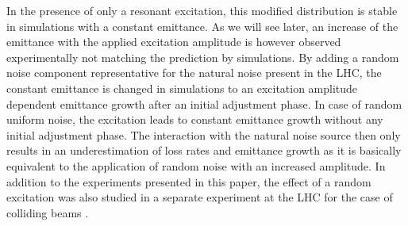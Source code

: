 \documentclass[%
 reprint,
 amsmath,amssymb,
 aps,
prstab,
longbibliography
]{revtex4-1}
\begin{document}
In the presence of only a resonant excitation, this modified
distribution is stable in simulations with a constant emittance. As we
will see later, an increase of the emittance with the applied
excitation amplitude is however observed experimentally not matching
the prediction by simulations. By adding a random noise component
representative for the natural noise present in the LHC, the constant
emittance is changed in simulations to an excitation amplitude
dependent emittance growth after an initial adjustment phase. In case
of random uniform noise, the excitation leads to constant emittance
growth without any initial adjustment phase. The interaction with the
natural noise source then only results in an underestimation of loss
rates and emittance growth as it is basically equivalent to the
application of random noise with an increased amplitude. In addition
to the experiments presented in this paper, the effect of a random
excitation was also studied in a separate experiment at the LHC for
the case of colliding beams
\cite{md1433_noise_top_energy,md_noise_bbLHC}.
\end{document}
